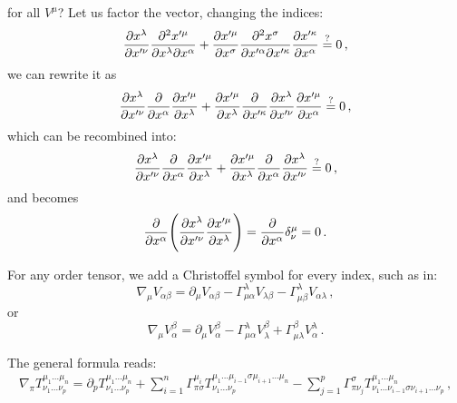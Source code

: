 \documentclass[main.tex]{subfiles}
\begin{document}
%
for all \(V^{\mu }\)? Let us factor the vector, changing the indices: 
%
\begin{equation}
    \pdv{x^{\lambda }}{x^{\prime \nu }} \pdv[2]{x^{\prime \mu }}{x^{\lambda }}{x^{\alpha }}
    + \pdv{x^{\prime \mu }}{x^{\sigma }} \pdv[2]{x^{ \sigma }}{x^{\prime \alpha }}{x^{\prime \kappa }} \pdv{x^{\prime \kappa }}{x^{ \alpha }} \overset{?}{=} 0
\,,
\end{equation}
%
we can rewrite it as 
%
\begin{equation}
    \pdv{x^{\lambda }}{x^{\prime \nu }} \pdv{}{x^{\alpha }}  \pdv{x^{\prime \mu }}{x^{\lambda }}
    + \pdv{x^{\prime \mu }}{x^{\lambda  }} 
    \pdv{}{x^{\prime \kappa }} 
    \pdv{x^{ \lambda }}{x^{\prime \nu }}
    \pdv{x^{\prime \mu }}{x^{ \alpha }} \overset{?}{=} 0
\,,
\end{equation}
%
which can be recombined into: 
%
\begin{equation}
    \pdv{x^{\lambda }}{x^{\prime \nu }} \pdv{}{x^{\alpha }}  \pdv{x^{\prime \mu }}{x^{\lambda }}
    + \pdv{x^{\prime \mu }}{x^{\lambda  }} 
    \pdv{}{x^{\alpha  }} 
    \pdv{x^{ \lambda }}{x^{\prime \nu }}
    \overset{?}{=} 0
\,,
\end{equation}
%
and becomes 
%
\begin{equation}
  \pdv{}{x^{\alpha }} \qty(\pdv{x^{\lambda }}{x^{\prime \nu }} \pdv{x^{\prime \mu }}{x^{\lambda }} ) 
  = \pdv{}{x^{\alpha }} \delta^{\mu}_{\nu }
  = 0
\,.
\end{equation}
%

For any order tensor,  we add a Christoffel symbol for every index, such as in: 
%
\begin{equation}
  \nabla_{\mu }V_{\alpha \beta }   
  = \partial_\mu V_{\alpha \beta } - \Gamma^{\lambda}_{\mu \alpha }V_{\lambda \beta }- \Gamma^{\lambda }_{\mu \beta }V_{\alpha \lambda }
\,,
\end{equation}
%
or 
%
\begin{equation}
    \nabla_{\mu }V_{\alpha}^{\beta }   
    = \partial_\mu V_{\alpha}^{\beta }
    - \Gamma^{\lambda}_{\mu \alpha }V_{\lambda}^{\beta }
    + \Gamma^{\beta }_{\mu \lambda  }V_{\alpha}^{\lambda }
\,.
\end{equation}

The general formula reads: 
%
\begin{align}
\nabla_{\pi } T^{\mu_1 \dots \mu_{n}}_{\nu_1 \dots \nu_{p}} =
\partial_{p} T^{\mu_1 \dots \mu_{n}}_{\nu_1 \dots \nu_{p}}
+ \sum_{i=1}^{n} \Gamma^{\mu_{i}}_{\pi \sigma }
T^{\mu_1 \dots \mu_{i-1} \sigma \mu_{i+1} \dots \mu_{n}}_{\nu_1 \dots \nu_{p}}
- \sum _{j=1}^{p} \Gamma^{\sigma }_{\pi \nu_j}
T^{\mu_1 \dots \mu_{n}}_{\nu_1 \dots \nu_{i-1} \sigma \nu_{i+1} \dots \nu_{p}}
\,,
\end{align}
%
\end{document}
